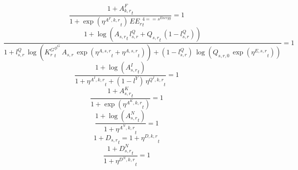 \noindent[name= `sector TFP final demand 4 1']
\begin{dmath}
\frac{1+{{A^{F}_{k,r}}}_{t}}{1+\exp\left({{\eta^{A^F,k,r}}}_{t}\right)\, {{EE_r}}_{t}^{4=={{s^{Energy}}}}}=1
\end{dmath}
\noindent[name= `sector TFP 5 1']
\begin{dmath}
\frac{1+\log\left({{A_{s,r}}}_{t}\, {{l^{Q}_{s,r}}}+{{Q_{s,r}}}_{t}\, \left(1-{{l^{Q}_{s,r}}}\right)\right)}{1+{{l^{Q}_{s,r}}}\, \log\left({{K^G_{r}}}_{t}^{{{\phi^{G}}}}\, {{A_{s,r}}}\, \exp\left({{\eta^{A,s,r}}}_{t}+{{\eta^{A,s,r}}}_{t}\right)\right)+\left(1-{{l^{Q}_{s,r}}}\right)\, \log\left({{Q_{s,r,0}}}\, \exp\left({{\eta^{E,s,r}}}_{t}\right)\right)}=1
\end{dmath}
\noindent[name= `intermediate input productivity 5 1']
\begin{dmath}
\frac{1+\log\left({{A^{I}_{s,r}}}_{t}\right)}{1+{{\eta^{A^{I},k,r}}}_{t}+\left(1-{{l^{Y}}}\right)\, {{\eta^{Q^{I},k,r}}}_{t}}=1
\end{dmath}
\noindent[name= `capital productivity shock 5 1']
\begin{dmath}
\frac{1+{{A^{K}_{s,r}}}_{t}}{1+\exp\left({{\eta^{A^{K},k,r}}}_{t}\right)}=1
\end{dmath}
\noindent[name= `labour productivity shock 5 1']
\begin{dmath}
\frac{1+\log\left({{A^{N}_{s,r}}}_{t}\right)}{1+{{\eta^{A^{N},k,r}}}_{t}}=1
\end{dmath}
\noindent[name= `TFP damage 5 1']
\begin{dmath}
1+{{D_{s,r}}}_{t}=1+{{\eta^{D,k,r}}}_{t}
\end{dmath}
\noindent[name= `labour damage 5 1']
\begin{dmath}
\frac{1+{{D^N_{s,r}}}_{t}}{1+{{\eta^{D^{N},k,r}}}_{t}}=1
\end{dmath}
\noindent[name= `capital damage 5 1']
